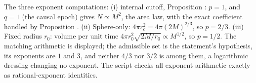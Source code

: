 The three exponent computations: (i) internal cutoff, Proposition : $p = 1$, and $q = 1$ (the causal epoch) gives $N \propto M^2$, the area law, with the exact coefficient handled by Proposition . (ii) Sphere-only: $4\pi r_c^2 = 4\pi(2M)^{2/3}$, so $p = 2/3$. (iii) Fixed radius $r_0$: volume per unit time $4\pi r_0^2\sqrt{2M/r_0} \propto M^{1/2}$, so $p = 1/2$. The matching arithmetic is displayed; the admissible set is the statement's hypothesis, its exponents are $1$ and $3$, and neither $4/3$ nor $3/2$ is among them, a logarithmic dressing changing no exponent. The script checks all exponent arithmetic exactly as rational-exponent identities.
